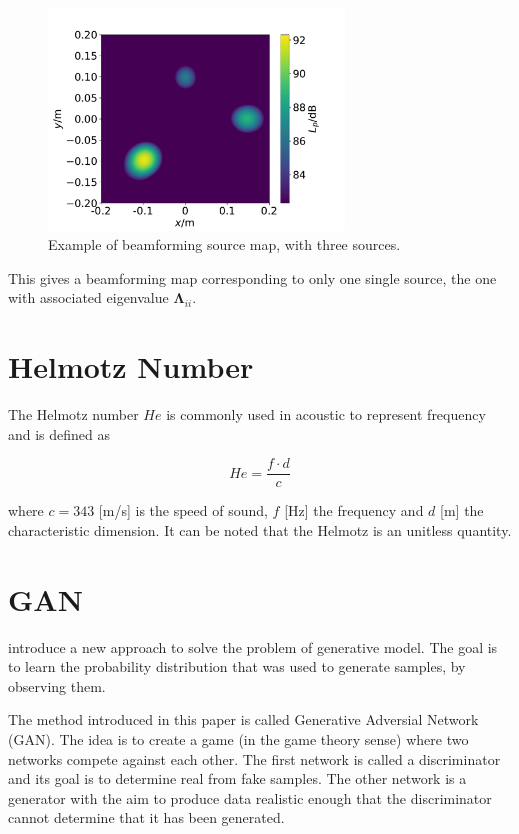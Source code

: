 \documentclass[11pt,a4paper,twoside]{report}
\begin{document}
\begin{figure}
    \centering
    \includegraphics[width=0.7\textwidth]{figs/beamforming_example.pdf}
    \caption{Example of beamforming source map, with three sources.}
    \label{fig:beamforming_example}    
\end{figure}

This gives a beamforming map corresponding to only one single source, the one with associated eigenvalue $\mathbf{\Lambda}_{ii}$.

\section{Helmotz Number}

The Helmotz number $He$ is commonly used in acoustic to represent frequency and is defined as

\begin{equation}
    He = \frac{f \cdot d}{c}  
\end{equation}

where $c = 343$ [m/s] is the speed of sound, $f$ [Hz] the frequency and $d$ [m] the characteristic dimension. It can be noted that the Helmotz is an unitless quantity. 

\section{GAN}

\cite{goodfellow2020generative} introduce a new approach to solve the problem of generative model. The goal is to learn the probability distribution that was used to generate samples, by observing them.

The method introduced in this paper is called Generative Adversial Network (GAN). The idea is to create a game (in the game theory sense) where two networks compete against each other. The first network is called a discriminator and its goal is to determine real from fake samples. The other network is a  generator with the aim to produce data realistic enough that the discriminator cannot determine that it has been generated.
\end{document}
